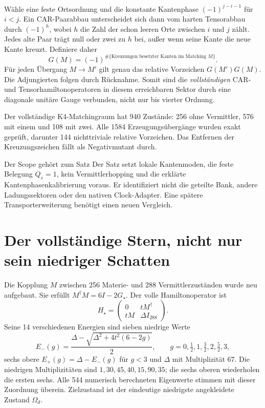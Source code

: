 Wähle eine feste Ortsordnung und die konstante Kantenphase $(-1)^{j-i-1}$ für $i<j$. Ein CAR-Paarabbau unterscheidet sich dann vom harten Tensorabbau durch $(-1)^h$, wobei $h$ die Zahl der schon leeren Orte zwischen $i$ und $j$ zählt. Jedes alte Paar trägt null oder zwei zu $h$ bei, außer wenn seine Kante die neue Kante kreuzt. Definiere daher
\begin{equation}
G(M)=(-1)^{\#\{\text{Kreuzungen besetzter Kanten im Matching }M\}}.
\end{equation}
Für jeden Übergang $M\to M'$ gilt genau das relative Vorzeichen $G(M')G(M)$. Die Adjungierten folgen durch Rücknahme. Somit sind die \emph{vollständigen} CAR- und Tensorhamiltonoperatoren in diesem erreichbaren Sektor durch eine diagonale unitäre Gauge verbunden, nicht nur bis vierter Ordnung.

Der vollständige K4-Matchingraum hat 940 Zustände: 256 ohne Vermittler, 576 mit einem und 108 mit zwei. Alle 1584 Erzeugungsübergänge wurden exakt geprüft, darunter 144 nichttriviale relative Vorzeichen. Das Entfernen der Kreuzungszeichen fällt als Negativmutant durch.

\begin{grenze}{Der Scope gehört zum Satz}
Der Satz setzt lokale Kantenmoden, die feste Belegung $Q_v=1$, kein Vermittlerhopping und die erklärte Kantenphasenkalibrierung voraus. Er identifiziert nicht die geteilte Bank, andere Ladungssektoren oder den nativen Clock-Adapter. Eine spätere Transporterweiterung benötigt einen neuen Vergleich.
\end{grenze}

\section{Der vollständige Stern, nicht nur sein niedriger Schatten}
Die Kopplung $M$ zwischen 256 Materie- und 288 Vermittlerzuständen wurde neu aufgebaut. Sie erfüllt $M^\dagger M=6I-2G_\star$. Der volle Hamiltonoperator ist
\begin{equation}
H_\star=\begin{pmatrix}0&tM^\dagger\\tM&\Delta I_{288}\end{pmatrix}.
\end{equation}
Seine 14 verschiedenen Energien sind sieben niedrige Werte
\begin{equation}
E_-(g)=\frac{\Delta-\sqrt{\Delta^2+4t^2(6-2g)}}2,
\qquad g=0,\tfrac12,1,\tfrac32,2,\tfrac52,3,
\end{equation}
sechs obere $E_+(g)=\Delta-E_-(g)$ für $g<3$ und $\Delta$ mit Multiplizität 67. Die niedrigen Multiplizitäten sind $1,30,45,40,15,90,35$; die sechs oberen wiederholen die ersten sechs. Alle 544 numerisch berechneten Eigenwerte stimmen mit dieser Zuordnung überein. Zielzustand ist der eindeutige niedrigste angekleidete Zustand $\Omega_d$.

